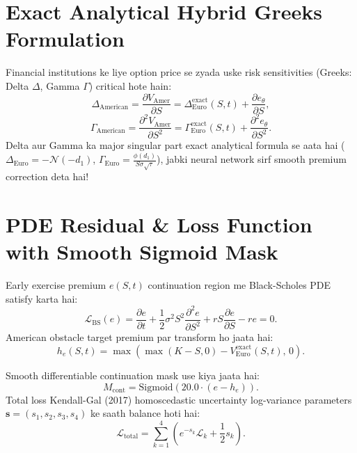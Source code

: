 \documentclass[11pt,a4paper,oneside]{book}
\begin{document}
\section{Exact Analytical Hybrid Greeks Formulation}
Financial institutions ke liye option price se zyada uske risk sensitivities (Greeks: Delta $\Delta$, Gamma $\Gamma$) critical hote hain:
\begin{equation}
    \Delta_{\text{American}} = \frac{\partial V_{\text{Amer}}}{\partial S} = \Delta_{\text{Euro}}^{\text{exact}}(S, t) + \frac{\partial e_\theta}{\partial S},
\end{equation}
\begin{equation}
    \Gamma_{\text{American}} = \frac{\partial^2 V_{\text{Amer}}}{\partial S^2} = \Gamma_{\text{Euro}}^{\text{exact}}(S, t) + \frac{\partial^2 e_\theta}{\partial S^2}.
\end{equation}
Delta aur Gamma ka major singular part exact analytical formula se aata hai ($\Delta_{\text{Euro}} = -\mathcal{N}(-d_1)$, $\Gamma_{\text{Euro}} = \frac{\phi(d_1)}{S\sigma\sqrt{\tau}}$), jabki neural network sirf smooth premium correction deta hai!

\section{PDE Residual \& Loss Function with Smooth Sigmoid Mask}
Early exercise premium $e(S, t)$ continuation region me Black-Scholes PDE satisfy karta hai:
\begin{equation}
    \mathcal{L}_{\text{BS}}(e) = \frac{\partial e}{\partial t} + \frac{1}{2}\sigma^2 S^2 \frac{\partial^2 e}{\partial S^2} + r S \frac{\partial e}{\partial S} - r e = 0.
\end{equation}
American obstacle target premium par transform ho jaata hai:
\begin{equation}
    h_e(S, t) = \max\left( \max(K-S, 0) - V_{\text{Euro}}^{\text{exact}}(S, t), \, 0 \right).
\end{equation}

Smooth differentiable continuation mask use kiya jaata hai:
\begin{equation}
    M_{\text{cont}} = \text{Sigmoid}\left( 20.0 \cdot (e - h_e) \right).
\end{equation}
Total loss Kendall-Gal (2017) homoscedastic uncertainty log-variance parameters $\mathbf{s} = (s_1, s_2, s_3, s_4)$ ke saath balance hoti hai:
\begin{equation}
    \mathcal{L}_{\text{total}} = \sum_{k=1}^4 \left( e^{-s_k} \mathcal{L}_k + \frac{1}{2} s_k \right).
\end{equation}
\end{document}
